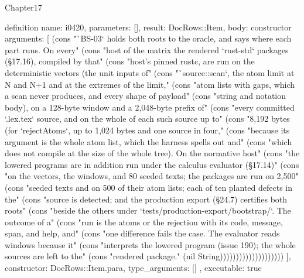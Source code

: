 \begin{lexlean}{Chapter17}
\begin{semanticmodule}
definition{
  name: i0420,
  parameters: [],
  result: DocRows::Item,
  body: constructor{
    arguments: [
      (cons "`BS-03` holds both roots to the oracle, and says where each part runs. On every" (cons "host of the matrix the rendered `rust-std` packages (§17.16), compiled by that" (cons "host's pinned rustc, are run on the deterministic vectors (the unit inputs of" (cons "`source::scan`, the atom limit at N and N+1 and at the extremes of the limit," (cons "atom lists with gaps, which a scan never produces, and every shape of payload" (cons "string and notation body), on a 128-byte window and a 2,048-byte prefix of" (cons "every committed `.lex.tex` source, and on the whole of each such source up to" (cons "8,192 bytes (for `rejectAtoms`, up to 1,024 bytes and one source in four," (cons "because its argument is the whole atom list, which the harness spells out and" (cons "which does not compile at the size of the whole tree). On the normative host" (cons "the lowered programs are in addition run under the calculus evaluator (§17.14)" (cons "on the vectors, the windows, and 80 seeded texts; the packages are run on 2,500" (cons "seeded texts and on 500 of their atom lists; each of ten planted defects in the" (cons "source is detected; and the production export (§24.7) certifies both roots" (cons "beside the others under `tests/production-export/bootstrap/`. The outcome of a" (cons "run is the atoms or the rejection with its code, message, span, and help, and" (cons "one difference fails the case. The evaluator reads windows because it" (cons "interprets the lowered program (issue 190); the whole sources are left to the" (cons "rendered package." (nil String))))))))))))))))))))
    ],
    constructor: DocRows::Item.para,
    type_arguments: []
  },
  executable: true
}


\end{semanticmodule}
\end{lexlean}
